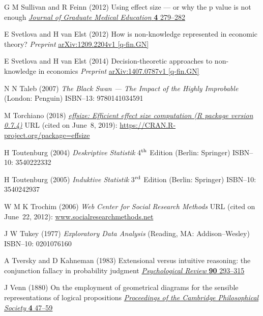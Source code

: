 \begin{thebibliography}{99}
G M Sullivan and R Feinn
(2012) Using effect size --- or why the p value is not enough
\href{https://doi.org/10.4300/JGME-D-12-00156.1}{\textit{Journal of
Graduate Medical Education} \textbf{4} 279--282}

E Svetlova and H van Elst
(2012) How is non-knowledge represented in economic theory?
\textit{Preprint} 
\href{http://arxiv.org/abs/1209.2204}{arXiv:1209.2204v1 [q-fin.GN]}

E Svetlova and H van Elst
(2014) Decision-theoretic approaches to non-knowledge in economics
\textit{Preprint} 
\href{http://arxiv.org/abs/1407.0787}{arXiv:1407.0787v1 [q-fin.GN]}

N N Taleb
(2007) \textit{The Black Swan --- The Impact of the Highly
Improbable} (London: Penguin)
ISBN--13: 9780141034591

M Torchiano
(2018) \href{https://doi.org/10.5281/zenodo.1480624}{\textit{effsize:
Efficient effect size computation (R package version 0.7.4)}}
URL (cited on June~8, 2019): 
\href{https://CRAN.R-project.org/package=effsize}{https://CRAN.R-project.org/package=effsize}

H Toutenburg
(2004) \textit{Deskriptive Statistik}
4$^{\rm th}$ Edition (Berlin: Springer) ISBN--10: 3540222332

H Toutenburg
(2005) \textit{Induktive Statistik}
3$^{\rm rd}$ Edition (Berlin: Springer) ISBN--10: 3540242937

W M K Trochim
(2006) \textit{Web Center for Social Research Methods} URL (cited
on June~22, 2012): \href{http://www.socialresearchmethods.net/}{www.socialresearchmethods.net}

J W Tukey
(1977) \textit{Exploratory Data Analysis}
(Reading, MA: Addison--Wesley)
ISBN--10: 0201076160

A Tversky and D Kahneman
(1983) Extensional versus intuitive reasoning: the conjunction 
fallacy in probability judgment
\href{http://dx.doi.org/10.1037/0033-295X.90.4.293}{\textit{Psychological Review} \textbf{90} 293--315}

J Venn
(1880) On the employment of geometrical diagrams for the sensible 
representations of logical propositions
\href{https://archive.org/stream/proceedingsofcam4188083camb#page/47/mode/1up}{\textit{Proceedings of the Cambridge Philosophical Society}
\textbf{4} 47--59}


\end{thebibliography}
